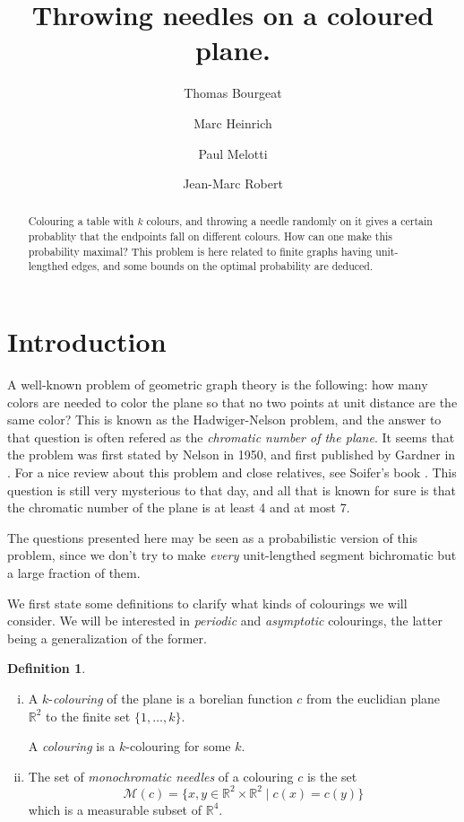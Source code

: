 \documentclass[a4paper,11pt]{article}
\title{Throwing needles on a coloured plane.}
\author{Thomas Bourgeat \and Marc Heinrich \and Paul Melotti 
\and Jean-Marc Robert}
\theoremstyle{definition}
\newtheorem{definition}{Definition}
\theoremstyle{remark}
\newcommand{\R}{\mathbb{R}}
\newcommand{\M}{\mathcal{M}}
\begin{document}
\maketitle

\begin{abstract} Colouring a table with $k$ colours, and throwing a needle
randomly on it gives a certain probablity that the endpoints fall on 
different colours. How can one make this probability maximal?
This problem is here related to finite graphs having unit-lengthed edges, and 
some bounds on the optimal probability are deduced.\end{abstract}


\section{Introduction}

A well-known problem of geometric graph theory is the following: how many colors
are needed to color the plane so that no two points at unit distance are the 
same color? This is known as the Hadwiger-Nelson problem, and the answer to that
question is often refered as the \textit{chromatic number of the plane}. It 
seems that the problem was first stated by Nelson in 1950, and first published by 
Gardner in \cite{gardner}.
For a nice review about this problem and close relatives, see Soifer's book
\cite{soifer}. This question is still very mysterious to that day, and all that 
is known for sure is that the chromatic number of the plane is at least 4 and at
most 7.

The questions presented here may be seen as a probabilistic version of this 
problem, since we don't try to make \textit{every} unit-lengthed segment 
bichromatic but a large fraction of them.

We first state some definitions to clarify what kinds of colourings we will consider.
We will be interested in \textit{periodic} and \textit{asymptotic} colourings,
the latter being a generalization of the former.
\begin{definition}
\
\begin{enumerate}[i)] 
\item A $k$-\textit{colouring} of the plane is a borelian function $c$ from the euclidian 
plane~$\R ^2$ to the finite set $\{1, \dots , k \}$.

A \textit{colouring} is a $k$-colouring for some $k$.
\item The set of \textit{monochromatic needles} of a colouring $c$ is the set
\[ \M (c) = \{x,y \in \R ^2 \times \R ^2 \mid c(x) = c(y) \} \]
which is a measurable subset of $\R ^4$.
\end{enumerate}
\end{definition}
\end{document}
